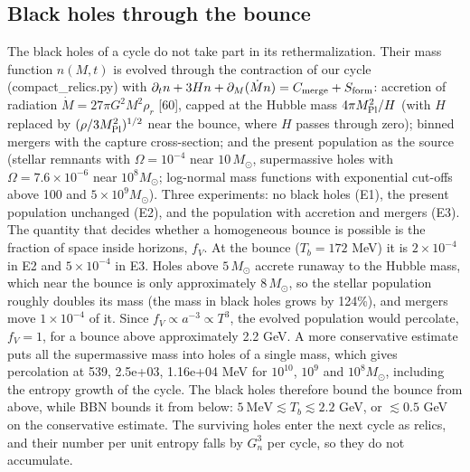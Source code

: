\documentclass[11pt,a4paper]{article}
\begin{document}
\subsection{Black holes through the bounce}
The black holes of a cycle do not take part in its rethermalization. Their mass function $n(M,t)$ is evolved through the contraction of our cycle (compact\_relics.py) with $\partial_tn+3Hn+\partial_M(\dot Mn)=C_{\rm merge}+S_{\rm form}$: accretion of radiation $\dot M=27\pi G^2M^2\rho_r$ [60], capped at the Hubble mass $4\pi M_{\rm Pl}^2/H$ (with $H$ replaced by $(\rho/3M_{\rm Pl}^2)^{1/2}$ near the bounce, where $H$ passes through zero); binned mergers with the capture cross-section; and the present population as the source (stellar remnants with $\Omega=10^{-4}$ near $10\,M_\odot$, supermassive holes with $\Omega=7.6\times10^{-6}$ near $10^8M_\odot$; log-normal mass functions with exponential cut-offs above 100 and $5\times10^9M_\odot$). Three experiments: no black holes (E1), the present population unchanged (E2), and the population with accretion and mergers (E3). The quantity that decides whether a homogeneous bounce is possible is the fraction of space inside horizons, $f_V$. At the bounce ($T_b=172$ MeV) it is $2\times10^{-4}$ in E2 and $5\times10^{-4}$ in E3. Holes above $5\,M_\odot$ accrete runaway to the Hubble mass, which near the bounce is only approximately $8\,M_\odot$, so the stellar population roughly doubles its mass (the mass in black holes grows by 124\%), and mergers move $1\times10^{-4}$ of it. Since $f_V\propto a^{-3}\propto T^3$, the evolved population would percolate, $f_V=1$, for a bounce above approximately 2.2 GeV. A more conservative estimate puts all the supermassive mass into holes of a single mass, which gives percolation at 539, 2.5e+03, 1.16e+04 MeV for $10^{10}$, $10^9$ and $10^8M_\odot$, including the entropy growth of the cycle. The black holes therefore bound the bounce from above, while BBN bounds it from below: $5\ \mathrm{MeV}\lesssim T_b\lesssim2.2$ GeV, or $\lesssim0.5$ GeV on the conservative estimate. The surviving holes enter the next cycle as relics, and their number per unit entropy falls by $G_n^3$ per cycle, so they do not accumulate.
\end{document}
